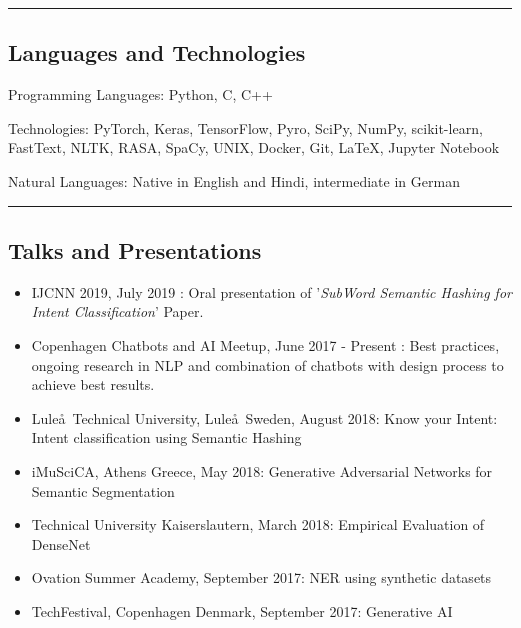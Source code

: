 \documentclass[10pt,letterpaper]{article}
\newenvironment{indentsection}[1]%
{\begin{list}{}%
	{\setlength{\leftmargin}{#1}}%
	\item[]%
}
{\end{list}}
\begin{document}
\hrule
\vspace{-0.4em}
\subsection*{\color{MidnightBlue}Languages and Technologies}

\begin{indentsection}{\parindent}
\begin{description*}
	\item[\color{BrickRed}Programming Languages:]
	Python, C, C++
	\item[\color{BrickRed}Technologies:]
	PyTorch, Keras, TensorFlow, Pyro, SciPy, NumPy, scikit-learn, FastText, NLTK, RASA, SpaCy, UNIX, Docker, Git, \LaTeX, Jupyter Notebook
	\item[\color{BrickRed}Natural Languages:]
	Native in English and Hindi, intermediate in German	
\end{description*}
\end{indentsection}

\hrule
\vspace{-0.4em}
\subsection*{\color{MidnightBlue}Talks and Presentations}

\begin{itemize}
	\parskip=0.1em
	
	\item {\color{BrickRed} IJCNN 2019}, July 2019 : Oral presentation of '\textit{SubWord Semantic Hashing for Intent Classification}' Paper.
	
	\item {\color{BrickRed} Copenhagen Chatbots and AI Meetup}, June 2017 - Present : Best practices, ongoing research in NLP and combination of chatbots with design process to achieve best results.
	
	\item {\color{BrickRed} Lule\aa\ Technical University}, Lule\aa\ Sweden, August 2018: Know your Intent: Intent classification using Semantic Hashing
	
	\item {\color{BrickRed} iMuSciCA}, Athens Greece, May 2018: Generative Adversarial Networks for Semantic Segmentation 
	\item {\color{BrickRed} Technical University Kaiserslautern}, March 2018: Empirical Evaluation of DenseNet 
		
	\item {\color{BrickRed} Ovation Summer Academy}, September 2017: NER using synthetic datasets 
	
	\item {\color{BrickRed} TechFestival}, Copenhagen Denmark, September 2017: Generative AI 
	
\end{itemize}
\end{document}

